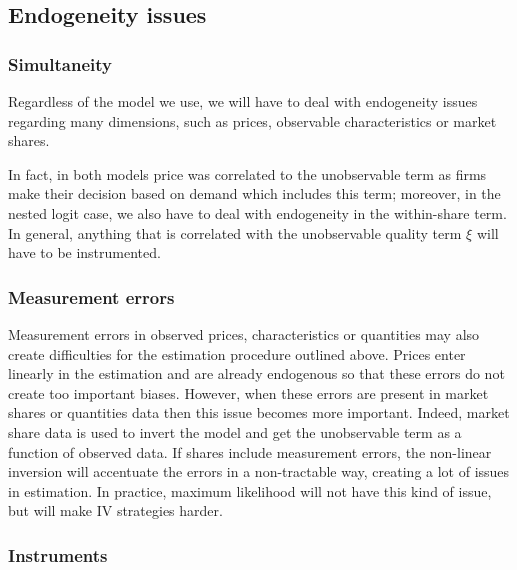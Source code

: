\subsection{Endogeneity issues}

\subsubsection{Simultaneity}

Regardless of the model we use, we will have to deal with endogeneity issues regarding many dimensions, such as prices, observable characteristics or market shares. 

In fact, in both models price was correlated to the unobservable term as firms make their decision based on demand which includes this term; moreover, in the nested logit case, we also have to deal with endogeneity in the within-share term. In general, anything that is correlated with the unobservable quality term $\xi$ will have to be instrumented.

\subsubsection{Measurement errors}

Measurement errors in observed prices, characteristics or quantities may also create difficulties for the estimation procedure outlined above. Prices enter linearly in the estimation and are already endogenous so that these errors do not create too important biases. However, when these errors are present in market shares or quantities data then this issue becomes more important. Indeed, market share data is used to invert the model and get the unobservable term as a function of observed data. If shares include measurement errors, the non-linear inversion will accentuate the errors in a non-tractable way, creating a lot of issues in estimation. In practice, maximum likelihood will not have this kind of issue, but will make IV strategies harder.

\subsubsection{Instruments}

